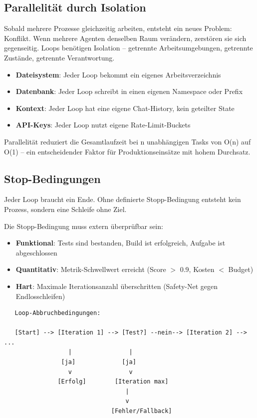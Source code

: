 \subsection{Parallelität durch Isolation}

Sobald mehrere Prozesse gleichzeitig arbeiten, entsteht ein neues Problem: Konflikt. Wenn mehrere Agenten denselben Raum verändern, zerstören sie sich gegenseitig. Loops benötigen Isolation -- getrennte Arbeitsumgebungen, getrennte Zustände, getrennte Verantwortung.

\begin{itemize}[leftmargin=*]
    \item \textbf{Dateisystem}: Jeder Loop bekommt ein eigenes Arbeitsverzeichnis
    \item \textbf{Datenbank}: Jeder Loop schreibt in einen eigenen Namespace oder Prefix
    \item \textbf{Kontext}: Jeder Loop hat eine eigene Chat-History, kein geteilter State
    \item \textbf{API-Keys}: Jeder Loop nutzt eigene Rate-Limit-Buckets
\end{itemize}

Parallelität reduziert die Gesamtlaufzeit bei n unabhängigen Tasks von O(n) auf O(1) -- ein entscheidender Faktor für Produktionseinsätze mit hohem Durchsatz.

\subsection{Stop-Bedingungen}

Jeder Loop braucht ein Ende. Ohne definierte Stopp-Bedingung entsteht kein Prozess, sondern eine Schleife ohne Ziel.

Die Stopp-Bedingung muss extern überprüfbar sein:

\begin{itemize}[leftmargin=*]
    \item \textbf{Funktional}: Tests sind bestanden, Build ist erfolgreich, Aufgabe ist abgeschlossen
    \item \textbf{Quantitativ}: Metrik-Schwellwert erreicht (Score $>$ 0.9, Kosten $<$ Budget)
    \item \textbf{Hart}: Maximale Iterationsanzahl überschritten (Safety-Net gegen Endlosschleifen)
\end{itemize}

\begin{verbatim}
   Loop-Abbruchbedingungen:

   [Start] --> [Iteration 1] --> [Test?] --nein--> [Iteration 2] --> ...
                  |                |
                [ja]             [ja]
                  v                v
               [Erfolg]        [Iteration max]
                                  |
                                  v
                              [Fehler/Fallback]
\end{verbatim}

